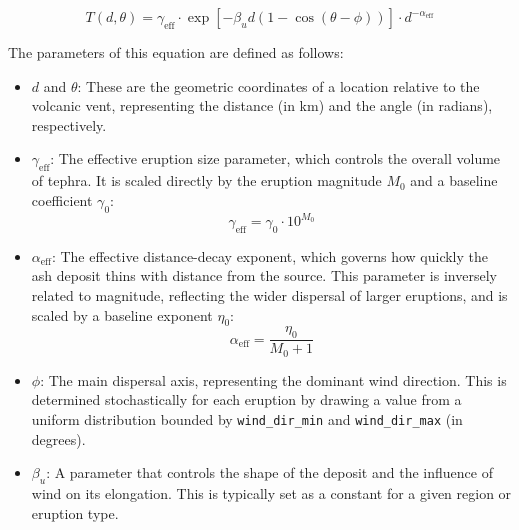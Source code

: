 \documentclass[12pt, a4paper]{article}
\begin{document}
\begin{equation}
    T(d, \theta) = \gamma_{\text{eff}} \cdot \exp[-\beta_u d(1-\cos(\theta - \phi))] \cdot d^{-\alpha_{\text{eff}}}
    \label{eq:ashfall}
\end{equation}

The parameters of this equation are defined as follows:
\begin{itemize}
    \item \(d\) and \(\theta\): These are the geometric coordinates of a location relative to the volcanic vent, representing the distance (in km) and the angle (in radians), respectively.
    \item \(\gamma_{\text{eff}}\): The effective eruption size parameter, which controls the overall volume of tephra. It is scaled directly by the eruption magnitude \(M_0\) and a baseline coefficient \(\gamma_0\):
    \begin{equation}
        \gamma_{\text{eff}} = \gamma_0 \cdot 10^{M_0}
    \end{equation}
    \item \(\alpha_{\text{eff}}\): The effective distance-decay exponent, which governs how quickly the ash deposit thins with distance from the source. This parameter is inversely related to magnitude, reflecting the wider dispersal of larger eruptions, and is scaled by a baseline exponent \(\eta_0\):
    \begin{equation}
        \alpha_{\text{eff}} = \frac{\eta_0}{M_0 + 1}
    \end{equation}
    \item \(\phi\): The main dispersal axis, representing the dominant wind direction. This is determined stochastically for each eruption by drawing a value from a uniform distribution bounded by \texttt{wind\_dir\_min} and \texttt{wind\_dir\_max} (in degrees).
    \item \(\beta_u\): A parameter that controls the shape of the deposit and the influence of wind on its elongation. This is typically set as a constant for a given region or eruption type.
\end{itemize}
\end{document}

